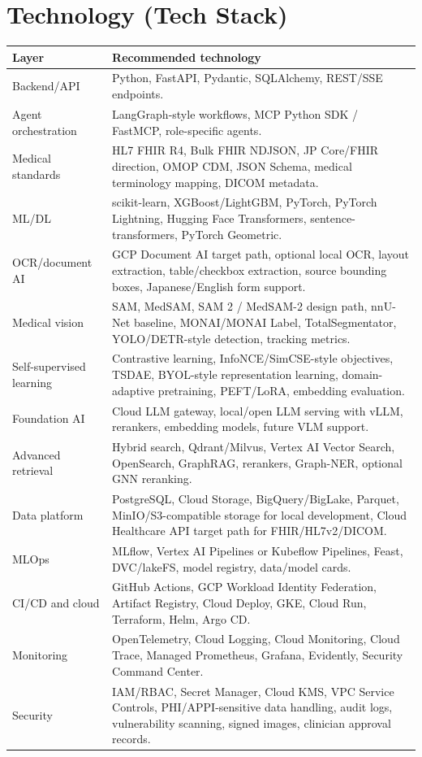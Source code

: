 \documentclass[11pt,a4paper]{article}
\begin{document}
\section{Technology (Tech Stack)}

\begin{longtable}{p{}p{}}
\toprule
\textbf{Layer} & \textbf{Recommended technology} \\
\midrule
Backend/API & Python, FastAPI, Pydantic, SQLAlchemy, REST/SSE endpoints. \\
Agent orchestration & LangGraph-style workflows, MCP Python SDK / FastMCP, role-specific agents. \\
Medical standards & HL7 FHIR R4, Bulk FHIR NDJSON, JP Core/FHIR direction, OMOP CDM, JSON Schema, medical terminology mapping, DICOM metadata. \\
ML/DL & scikit-learn, XGBoost/LightGBM, PyTorch, PyTorch Lightning, Hugging Face Transformers, sentence-transformers, PyTorch Geometric. \\
OCR/document AI & GCP Document AI target path, optional local OCR, layout extraction, table/checkbox extraction, source bounding boxes, Japanese/English form support. \\
Medical vision & SAM, MedSAM, SAM 2 / MedSAM-2 design path, nnU-Net baseline, MONAI/MONAI Label, TotalSegmentator, YOLO/DETR-style detection, tracking metrics. \\
Self-supervised learning & Contrastive learning, InfoNCE/SimCSE-style objectives, TSDAE, BYOL-style representation learning, domain-adaptive pretraining, PEFT/LoRA, embedding evaluation. \\
Foundation AI & Cloud LLM gateway, local/open LLM serving with vLLM, rerankers, embedding models, future VLM support. \\
Advanced retrieval & Hybrid search, Qdrant/Milvus, Vertex AI Vector Search, OpenSearch, GraphRAG, rerankers, Graph-NER, optional GNN reranking. \\
Data platform & PostgreSQL, Cloud Storage, BigQuery/BigLake, Parquet, MinIO/S3-compatible storage for local development, Cloud Healthcare API target path for FHIR/HL7v2/DICOM. \\
MLOps & MLflow, Vertex AI Pipelines or Kubeflow Pipelines, Feast, DVC/lakeFS, model registry, data/model cards. \\
CI/CD and cloud & GitHub Actions, GCP Workload Identity Federation, Artifact Registry, Cloud Deploy, GKE, Cloud Run, Terraform, Helm, Argo CD. \\
Monitoring & OpenTelemetry, Cloud Logging, Cloud Monitoring, Cloud Trace, Managed Prometheus, Grafana, Evidently, Security Command Center. \\
Security & IAM/RBAC, Secret Manager, Cloud KMS, VPC Service Controls, PHI/APPI-sensitive data handling, audit logs, vulnerability scanning, signed images, clinician approval records. \\
\bottomrule
\end{longtable}
\end{document}
